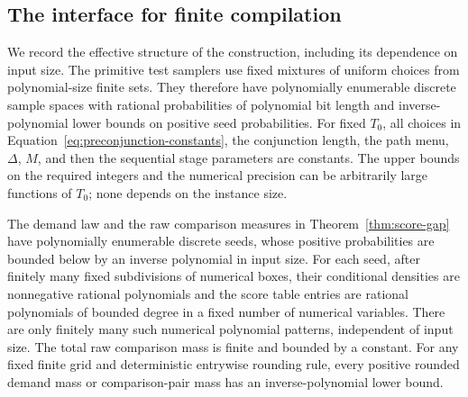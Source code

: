 \subsection{The interface for finite compilation}\label{subsec:score-compilation}

We record the effective structure of the construction, including its
dependence on input size. The primitive test samplers use fixed mixtures
of uniform choices from polynomial-size finite sets. They therefore have
polynomially enumerable discrete sample spaces with rational probabilities
of polynomial bit length and inverse-polynomial lower bounds on positive
seed probabilities. For fixed $T_0$, all choices in
Equation~\ref{eq:preconjunction-constants}, the conjunction length,
the path menu, $\Delta$, $M$, and then the sequential stage parameters
are constants. The upper bounds on the required integers and the
numerical precision can be arbitrarily large functions of $T_0$; none
depends on the instance size.

\begin{proposition}\label{prop:score-compilation}
The demand law and the raw comparison measures in
Theorem~\ref{thm:score-gap} have polynomially enumerable discrete seeds,
whose positive probabilities are bounded below by an inverse polynomial
in input size. For each seed, after finitely many fixed subdivisions of
numerical boxes, their conditional densities are nonnegative rational polynomials and the
score table entries are rational polynomials of bounded degree in a
fixed number of numerical variables. There are only finitely many
such numerical polynomial patterns, independent of input size.
The total raw comparison mass is finite and bounded by a constant.
For any fixed finite grid and deterministic entrywise rounding rule, every positive
rounded demand mass or comparison-pair mass has an inverse-polynomial
lower bound.
\end{proposition}

